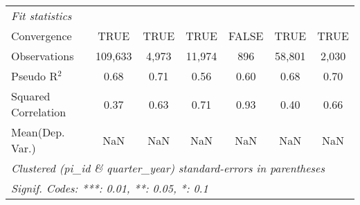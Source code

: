 \begin{tabular}{lcccccc}
   \midrule
   \emph{Fit statistics}\\
   Convergence                                                &TRUE            & TRUE           & TRUE         & FALSE         & TRUE    & TRUE\\  
   Observations                                               & 109,633        & 4,973          & 11,974       & 896           & 58,801  & 2,030\\  
   Pseudo R$^2$                                               & 0.68           & 0.71           & 0.56         & 0.60          & 0.68    & 0.70\\  
   Squared Correlation                                        & 0.37           & 0.63           & 0.71         & 0.93          & 0.40    & 0.66\\  
Mean(Dep. Var.) & NaN & NaN & NaN & NaN & NaN & NaN \\
   \midrule \midrule
   \multicolumn{7}{l}{\emph{Clustered (pi\_id \& quarter\_year) standard-errors in parentheses}}\\
   \multicolumn{7}{l}{\emph{Signif. Codes: ***: 0.01, **: 0.05, *: 0.1}}\\
\end{tabular}
\par\endgroup
